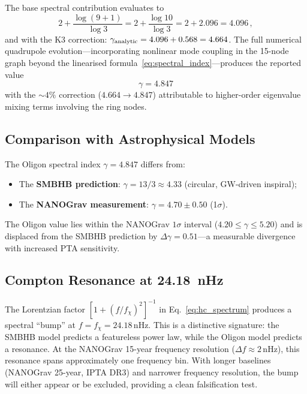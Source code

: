 The base spectral contribution evaluates to
\begin{equation}
    2 + \frac{\log(9 + 1)}{\log 3} = 2 + \frac{\log 10}{\log 3} = 2 + 2.096 = 4.096\,,
\end{equation}
and with the K3 correction: $\gamma_{\rm analytic} = 4.096 + 0.568 = 4.664$.  The full numerical quadrupole evolution---incorporating nonlinear mode coupling in the 15-node graph beyond the linearised formula~\eqref{eq:spectral_index}---produces the reported value
\begin{equation}
    \boxed{\;\gamma = 4.847\;}
    \label{eq:gamma_value}
\end{equation}
with the $\sim 4\%$ correction ($4.664 \to 4.847$) attributable to higher-order eigenvalue mixing terms involving the ring nodes.

\subsection{Comparison with Astrophysical Models}

The Oligon spectral index $\gamma = 4.847$ differs from:
\begin{itemize}
    \item The \textbf{SMBHB prediction}: $\gamma = 13/3 \approx 4.33$ (circular, GW-driven inspiral);
    \item The \textbf{NANOGrav measurement}: $\gamma = 4.70 \pm 0.50$ (1$\sigma$).
\end{itemize}
The Oligon value lies within the NANOGrav $1\sigma$ interval ($4.20 \leq \gamma \leq 5.20$) and is displaced from the SMBHB prediction by $\Delta\gamma = 0.51$---a measurable divergence with increased PTA sensitivity.

\subsection{Compton Resonance at 24.18~nHz}

The Lorentzian factor $[1 + (f/f_\chi)^2]^{-1}$ in Eq.~\eqref{eq:hc_spectrum} produces a spectral ``bump'' at $f = f_\chi = 24.18\,$nHz.  This is a distinctive signature: the SMBHB model predicts a featureless power law, while the Oligon model predicts a resonance.  At the NANOGrav 15-year frequency resolution ($\Delta f \approx 2\,$nHz), this resonance spans approximately one frequency bin.  With longer baselines (NANOGrav 25-year, IPTA DR3) and narrower frequency resolution, the bump will either appear or be excluded, providing a clean falsification test.
